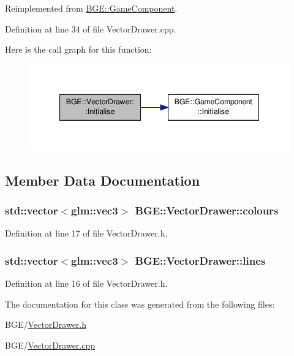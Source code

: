 Reimplemented from \hyperlink{class_b_g_e_1_1_game_component_ae1c2340cdfb31d2cd372323d3f9a1ba4}{B\-G\-E\-::\-Game\-Component}.



Definition at line 34 of file Vector\-Drawer.\-cpp.



Here is the call graph for this function\-:
\nopagebreak
\begin{figure}[H]
\begin{center}
\leavevmode
\includegraphics[width=344pt]{class_b_g_e_1_1_vector_drawer_aff3a17b54639d367ddc99b73e1b502ee_cgraph}
\end{center}
\end{figure}




\subsection{Member Data Documentation}
\hypertarget{class_b_g_e_1_1_vector_drawer_abd82945368793d8f39445de7a7971f60}{
\subsubsection[{colours}]{\setlength{\rightskip}{0pt plus 5cm}std\-::vector$<$glm\-::vec3$>$ B\-G\-E\-::\-Vector\-Drawer\-::colours}}\label{class_b_g_e_1_1_vector_drawer_abd82945368793d8f39445de7a7971f60}


Definition at line 17 of file Vector\-Drawer.\-h.

\hypertarget{class_b_g_e_1_1_vector_drawer_afb2d7fda84da169d879382755bef8560}{
\subsubsection[{lines}]{\setlength{\rightskip}{0pt plus 5cm}std\-::vector$<$glm\-::vec3$>$ B\-G\-E\-::\-Vector\-Drawer\-::lines}}\label{class_b_g_e_1_1_vector_drawer_afb2d7fda84da169d879382755bef8560}


Definition at line 16 of file Vector\-Drawer.\-h.



The documentation for this class was generated from the following files\-:\begin{DoxyCompactItemize}
\item 
B\-G\-E/\hyperlink{_vector_drawer_8h}{Vector\-Drawer.\-h}\item 
B\-G\-E/\hyperlink{_vector_drawer_8cpp}{Vector\-Drawer.\-cpp}\end{DoxyCompactItemize}
